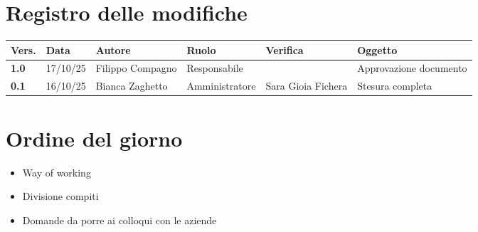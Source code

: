 \documentclass[a4paper,12pt]{article}
\begin{document}


\newpage
\section*{Registro delle modifiche}

\begin{table}[h!]
\begin{tabularx}{\textwidth}{|l|l|l|l|L|L|}
\hline
\textbf{Vers.} & \textbf{Data} & \textbf{Autore} & \textbf{Ruolo} & \textbf{Verifica} & \textbf{Oggetto} \\
\hline
\textbf{1.0} & 17/10/25 & Filippo Compagno & Responsabile &  & Approvazione documento \\
\textbf{0.1} & 16/10/25 & Bianca Zaghetto & Amministratore & Sara Gioia Fichera & Stesura completa \\
\hline
\end{tabularx}
\end{table}

\newpage
\tableofcontents
\newpage

\section{Ordine del giorno}
\begin{itemize}
    \item Way of working
    \item Divisione compiti
    \item Domande da porre ai colloqui con le aziende
\end{itemize}
\end{document}
